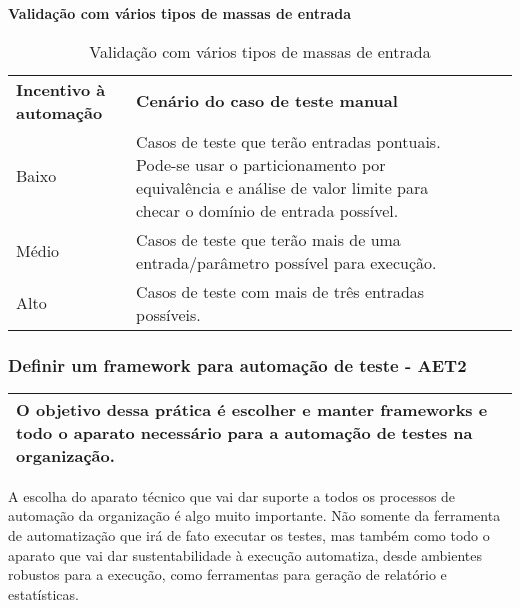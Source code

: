 \textbf{Validação com vários tipos de massas de entrada}

\begin{table}[!ht]
\centering
\caption{Validação com vários tipos de massas de entrada}
\label{my-label}
\begin{tabular}{|l|l|lll}
\cline{1-2}
\textbf{Incentivo à automação} & \textbf{Cenário do caso de teste manual}                                                                                                                         &  &  &  \\ \cline{1-2}
Baixo                          & Casos de teste que terão entradas pontuais. Pode-se usar o particionamento por equivalência e análise de valor limite para checar o domínio de entrada possível. &  &  &  \\ \cline{1-2}
Médio                          & Casos de teste que terão mais de uma entrada/parâmetro possível para execução.                                                                                   &  &  &  \\ \cline{1-2}
Alto                           & Casos de teste com mais de três entradas possíveis.                                                                                                              &  &  &  \\ \cline{1-2}
\end{tabular}
\end{table}

\subsubsection{ Definir um framework para automação de teste - AET2}
\label{sec:aet2}

\begin{table}[!ht]
\centering
\begin{tabular}{|p{130mm}|}
\hline
O objetivo dessa prática é escolher e manter frameworks e todo o aparato necessário para a automação de testes na organização. \\ 
\hline
\end{tabular}
\end{table}

A escolha do aparato técnico que vai dar suporte a todos os processos de automação da organização é algo muito importante. Não somente da ferramenta de automatização que irá de fato executar os testes, mas também como todo o aparato que vai dar sustentabilidade à execução automatiza, desde ambientes robustos para a execução, como ferramentas para geração de relatório e estatísticas.

